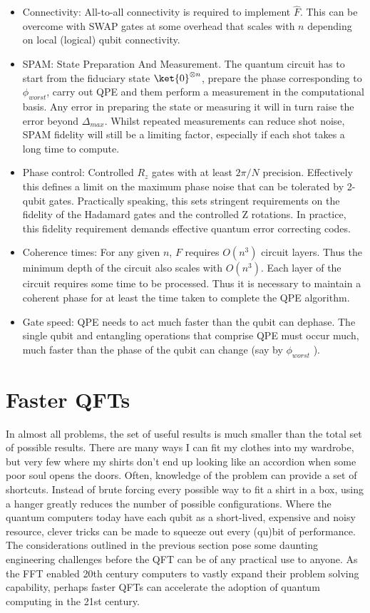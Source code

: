 \documentclass{book}
\begin{document}
\begin{itemize}
   \item Connectivity: All-to-all connectivity is required to implement $\hat{F}$. This can be overcome with SWAP gates at some overhead that scales with $n$ depending on local (logical) qubit connectivity.
   \item SPAM: State Preparation And Measurement. The quantum circuit has to start from the fiduciary state $\ket{0}^{\otimes n}$, prepare the phase corresponding to $\phi_{worst}$, carry out QPE and them perform a measurement in the computational basis. Any error in preparing the state or measuring it will in turn raise the error beyond $\Delta_{max}$. Whilst repeated measurements can reduce shot noise, SPAM fidelity will still be a limiting factor, especially if each shot takes a long time to compute.
   \item Phase control: Controlled $R_z$ gates with at least $2\pi/N$ precision. Effectively this defines a limit on the maximum phase noise that can be tolerated by 2-qubit gates. Practically speaking, this sets stringent requirements on the fidelity of the Hadamard gates and the controlled Z rotations. In practice, this fidelity requirement demands effective quantum error correcting codes.
   \item Coherence times: For any given $n$, $F$ requires $O(n^3)$ circuit layers. Thus the minimum depth of the circuit also scales with $O(n^3)$. Each layer of the circuit requires some time to be processed. Thus it is necessary to maintain a coherent phase for at least the time taken to complete the QPE algorithm.
   \item Gate speed: QPE needs to act much faster than the qubit can dephase. The single qubit and entangling operations that comprise QPE must occur much, much faster than the phase of the qubit can change (say by $\phi_{worst}$ ).

\end{itemize}

\section{Faster QFTs}

In almost all problems, the set of useful results is much smaller than the total set of possible results. There are many ways I can fit my clothes into my wardrobe, but very few where my shirts don't end up looking like an accordion when some poor soul opens the doors. Often, knowledge of the problem can provide a set of shortcuts. Instead of brute forcing every possible way to fit a shirt in a box, using a hanger greatly reduces the number of possible configurations. Where the quantum computers today have each qubit as a short-lived, expensive and noisy resource, clever tricks can be made to squeeze out every (qu)bit of performance. The considerations outlined in the previous section pose some daunting engineering challenges before the QFT can be of any practical use to anyone. As the FFT enabled 20th century computers to vastly expand their problem solving capability, perhaps faster QFTs can accelerate the adoption of quantum computing in the 21st century.  
\end{document}
